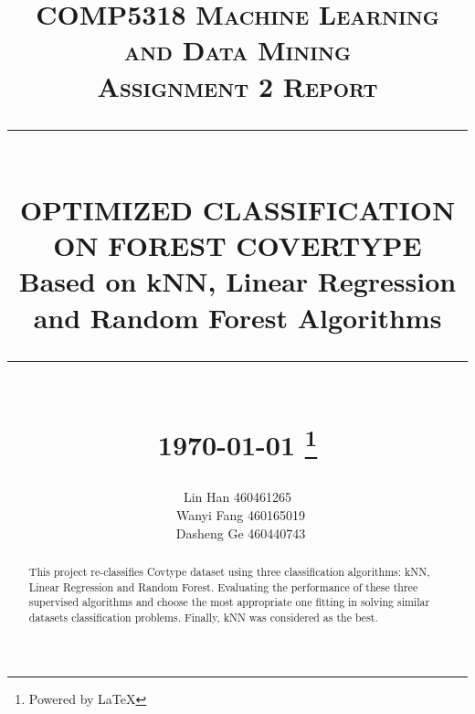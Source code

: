 \documentclass[12pt]{report}
\newcommand{\HRule}[1]{\rule{\linewidth}{#1}}
\begin{document}
\title{ \normalsize \textsc{COMP5318 Machine Learning and Data Mining 
		\\Assignment 2 Report}
		\\ [2.0cm]
		\HRule{0.5pt} \\
		\LARGE \textbf{\uppercase{Optimized Classification on Forest Covertype }}
        \\ \normalsize Based on kNN, Linear Regression and Random Forest Algorithms
		\HRule{2pt} \\ [0.5cm]
		\normalsize \today \vspace*{5\baselineskip}
        \footnote{Powered by \LaTeX}}

\date{}

\author{
        Lin Han 460461265 \\
        \ Wanyi Fang 460165019 \\
        \ Dasheng Ge 460440743}

\maketitle

\begin{abstract}
   This project re-classifies Covtype dataset using three classification algorithms: kNN, Linear Regression and Random Forest. Evaluating the performance of these three supervised algorithms and choose the most appropriate one fitting in solving similar datasets classification problems. Finally, kNN was considered as the best.
\end{abstract}

\tableofcontents
\newpage



\sectionfont{\scshape}

\end{document}
